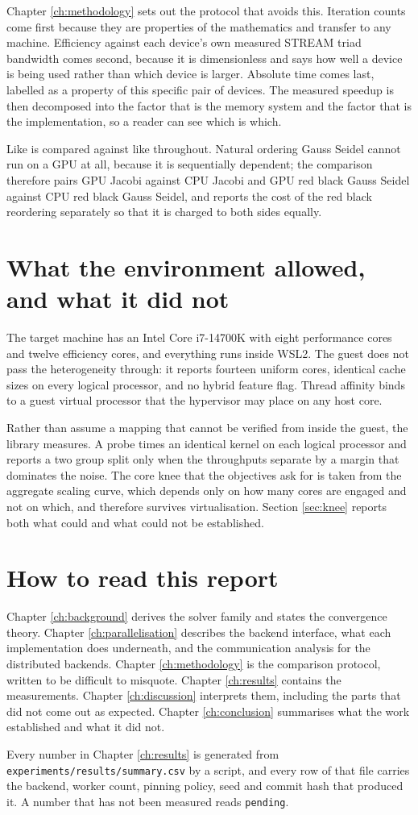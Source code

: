 Chapter \ref{ch:methodology} sets out the protocol that avoids this. Iteration
counts come first because they are properties of the mathematics and transfer to
any machine. Efficiency against each device's own measured STREAM triad
bandwidth comes second, because it is dimensionless and says how well a device
is being used rather than which device is larger. Absolute time comes last,
labelled as a property of this specific pair of devices. The measured speedup is
then decomposed into the factor that is the memory system and the factor that is
the implementation, so a reader can see which is which.

Like is compared against like throughout. Natural ordering Gauss Seidel cannot
run on a GPU at all, because it is sequentially dependent; the comparison
therefore pairs GPU Jacobi against CPU Jacobi and GPU red black Gauss Seidel
against CPU red black Gauss Seidel, and reports the cost of the red black
reordering separately so that it is charged to both sides equally.

\section{What the environment allowed, and what it did not}

The target machine has an Intel Core i7-14700K with eight performance cores and
twelve efficiency cores, and everything runs inside WSL2. The guest does not
pass the heterogeneity through: it reports fourteen uniform cores, identical
cache sizes on every logical processor, and no hybrid feature flag. Thread
affinity binds to a guest virtual processor that the hypervisor may place on any
host core.

Rather than assume a mapping that cannot be verified from inside the guest, the
library measures. A probe times an identical kernel on each logical processor
and reports a two group split only when the throughputs separate by a margin
that dominates the noise. The core knee that the objectives ask for is taken
from the aggregate scaling curve, which depends only on how many cores are
engaged and not on which, and therefore survives virtualisation. Section
\ref{sec:knee} reports both what could and what could not be established.

\section{How to read this report}

Chapter \ref{ch:background} derives the solver family and states the convergence
theory. Chapter \ref{ch:parallelisation} describes the backend interface, what
each implementation does underneath, and the communication analysis for the
distributed backends. Chapter \ref{ch:methodology} is the comparison protocol,
written to be difficult to misquote. Chapter \ref{ch:results} contains the
measurements. Chapter \ref{ch:discussion} interprets them, including the parts
that did not come out as expected. Chapter \ref{ch:conclusion} summarises what
the work established and what it did not.

Every number in Chapter \ref{ch:results} is generated from
\texttt{experiments/results/summary.csv} by a script, and every row of that file
carries the backend, worker count, pinning policy, seed and commit hash that
produced it. A number that has not been measured reads \texttt{pending}.
